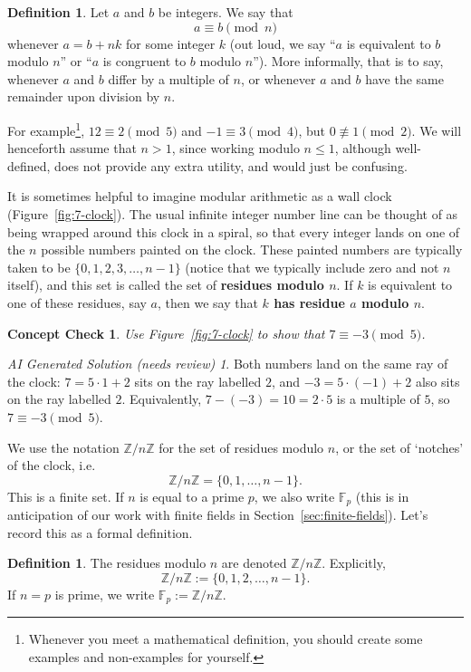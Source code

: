 \documentclass{article}
\theoremstyle{plain}
\newtheorem{checkin}[theorem]{Concept Check}
\theoremstyle{definition}
\newtheorem{definition}[theorem]{Definition}
\theoremstyle{remark}
\newtheorem*{aisolution}{AI Generated Solution (needs review)}
\numberwithin{theorem}{section}
\newcommand{\FF}{\mathbb{F}}
\newcommand{\ZZ}{\mathbb{Z}}
\begin{document}
\begin{definition}
Let $a$ and $b$ be integers.  We say that
\[
a \equiv b \pmod n
\]
whenever $a = b + nk$ for some integer $k$ (out loud, we say ``$a$ is equivalent to $b$ modulo $n$'' or ``$a$ is congruent to $b$ modulo $n$'').  More informally, that is to say, whenever $a$ and $b$ differ by a multiple of $n$, or whenever $a$ and $b$ have the same remainder upon division by $n$.
\end{definition}

For example\footnote{Whenever you meet a mathematical definition, you should create some examples and non-examples for yourself.}, $12 \equiv 2 \pmod 5$ and $-1 \equiv 3 \pmod 4$, but $0 \not\equiv 1 \pmod 2$.  We will henceforth assume that $n > 1$, since working modulo $n \le 1$, although well-defined, does not provide any extra utility, and would just be confusing.

It is sometimes helpful to imagine modular arithmetic as a wall clock (Figure~\ref{fig:7-clock}).  The usual infinite integer number line can be thought of as being wrapped around this clock in a spiral, so that every integer lands on one of the $n$ possible numbers painted on the clock.  These painted numbers are typically taken to be $\{ 0, 1, 2, 3, \ldots, n-1 \}$ (notice that we typically include zero and not $n$ itself), and this set is called the set of \textbf{residues modulo $n$}.  If $k$ is equivalent to one of these residues, say $a$, then we say that \textbf{$k$ has residue $a$ modulo $n$}.  

\begin{checkin}
    Use Figure~\ref{fig:7-clock} to show that $7 \equiv -3 \pmod{5}$.
\end{checkin}
\begin{aisolution}
Both numbers land on the same ray of the clock: $7 = 5\cdot 1 + 2$ sits on the ray labelled $2$, and $-3 = 5\cdot(-1) + 2$ also sits on the ray labelled $2$.  Equivalently, $7 - (-3) = 10 = 2\cdot 5$ is a multiple of $5$, so $7 \equiv -3 \pmod 5$.
\end{aisolution}


We use the notation $\ZZ/n\ZZ$ for the set of residues modulo $n$, or the set of `notches' of the clock, i.e.
\[
\ZZ/n\ZZ = \{ 0, 1, \ldots, n-1 \}.
\]
This is a finite set.  If $n$ is equal to a prime $p$, we also write $\FF_p$ (this is in anticipation of our work with finite fields in Section~\ref{sec:finite-fields}).  Let's record this as a formal definition.

\begin{definition}
	The residues modulo $n$ are denoted $\ZZ/n\ZZ$.  Explicitly,
	\[
		\ZZ/n\ZZ := \{ 0, 1, 2, \ldots, n-1 \}.
	\]
  If $n = p$ is prime, we write $\FF_p := \ZZ/n\ZZ$.
\end{definition}
\end{document}
